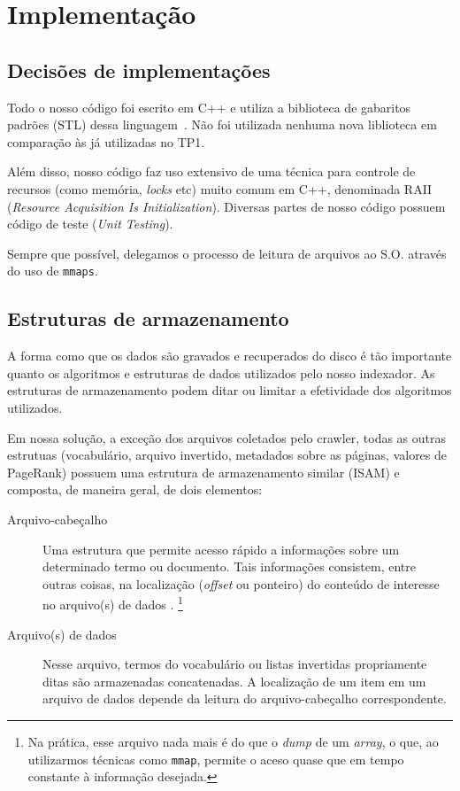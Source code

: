 \documentclass[10pt,twocolumn]{article}
\begin{document}

\section{Implementação}\label{sec:implementation}

\subsection{Decisões de implementações}

Todo o nosso código foi escrito em C++
e utiliza a biblioteca de gabaritos padrões (STL) dessa
linguagem~\cite{stroustrup97}.
Não foi utilizada nenhuma nova liblioteca em comparação às já utilizadas
no TP1.

Além disso, nosso código faz uso extensivo de uma técnica para controle
de recursos (como memória, \emph{locks} etc)  muito comum em C++,
denominada RAII (\emph{Resource Acquisition Is Initialization}).
Diversas partes de nosso código possuem código de teste (\emph{Unit
Testing}).

Sempre que possível, delegamos o processo de leitura de
arquivos ao S.O. através do uso de \texttt{mmaps}.

\subsection{Estruturas de armazenamento}\label{sec:storage}

A forma como que os dados são gravados e recuperados do disco é
tão importante quanto os algoritmos e estruturas de dados utilizados
pelo nosso indexador. As estruturas de armazenamento podem ditar ou
limitar a efetividade dos algoritmos utilizados.

Em nossa solução, a exceção dos arquivos coletados pelo crawler, todas
as outras estrutuas (vocabulário, arquivo invertido, metadados sobre as
páginas, valores de PageRank) possuem uma estrutura
de armazenamento similar (ISAM) e composta, de maneira geral, de dois
elementos:
\begin{description}

\item[Arquivo-cabeçalho] Uma estrutura que permite acesso rápido a
informações sobre um determinado termo ou documento.  Tais informações
consistem, entre outras coisas, na localização (\emph{offset} ou
ponteiro) do conteúdo de interesse no arquivo(s) de dados . \footnote{
Na prática, esse arquivo nada mais é do que o \emph{dump} de um
\emph{array}, o que, ao utilizarmos técnicas como \texttt{mmap}, permite
o aceso quase que em tempo constante à informação desejada.}

\item[Arquivo(s) de dados] Nesse arquivo, termos do vocabulário ou listas
invertidas propriamente ditas são armazenadas concatenadas. A
localização de um item em um arquivo de dados depende da leitura do
arquivo-cabeçalho correspondente.
\end{description}
\end{document}
